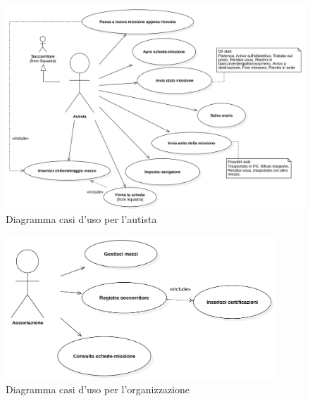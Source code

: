 \documentclass{article}
\begin{document}
    \begin{figure}
        \centering
        \includegraphics[width=5in]{diagrams/png/uc-autista.png}
        \caption{Diagramma casi d'uso per l'autista}
        \label{fig:uc-autista}
    \end{figure}
    \begin{figure}
        \centering
        \includegraphics[width=4in]{diagrams/png/uc-associazione.png}
        \caption{Diagramma casi d'uso per l'organizzazione}
        \label{fig:uc-organization}
    \end{figure}

    \def\graycolor{gray!15}
    \def\creationDate{Creato il 19/02/24.\space}
\end{document}
